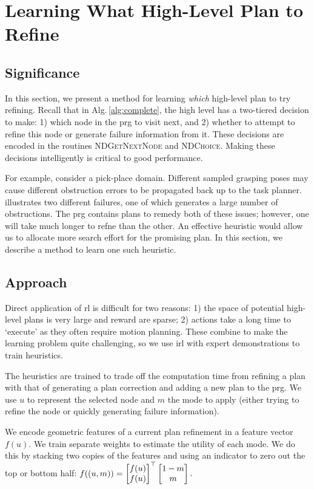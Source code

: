 \section{Learning What High-Level Plan to Refine}
\subsection{Significance}
In this section, we present a method for learning \emph{which} high-level plan to try
refining. Recall that in Alg.\,\ref{alg:complete}, the high level has
a two-tiered decision to make: 1) which node in the {\sc prg} to visit
next, and 2) whether to attempt to refine this node or generate
failure information from it. These decisions are encoded in the
routines \textsc{NDGetNextNode} and \textsc{NDChoice}. Making these
decisions intelligently is critical to good performance. 

For example, consider a pick-place domain. Different sampled grasping
poses may cause different obstruction errors to be propagated back up to
the task planner.  illustrates two different
failures, one of which generates a large number of obstructions. The
{\sc prg} contains plans to remedy both of these issues; however, one
will take much longer to refne than the other. An effective heuristic
would allow us to allocate more search effort for the promising
plan. In this section, we describe a method to learn one such
heuristic.

\subsection{Approach}
Direct application of {\sc rl} is difficult for two reasons: 1) the
space of potential high-level plans is very large and reward are
sparse; 2) actions take a long time to `execute' as they often require
motion planning. These combine to make the learning problem quite
challenging, so we use {\sc irl} with expert demonstrations to
train heuristics.

The heuristics are trained to trade off the computation time from
refining a plan with that of generating a plan correction and adding a
new plan to the {\sc prg}. We use $u$ to represent the selected node
and $m$ the mode to apply (either trying to refine the node or
quickly generating failure information).

We encode geometric features of a current plan refinement in a feature
vector $f(u).$ We train separate weights to estimate the utility of
each mode. We do this by stacking two copies of the features and using
an indicator to zero out the top or bottom half: $f((u, m))
= \begin{bmatrix} f(u) \\ f(u) \end{bmatrix}^\top \begin{bmatrix} 1 -
  m \\ m \end{bmatrix}.\vspace{2pt}$ 

